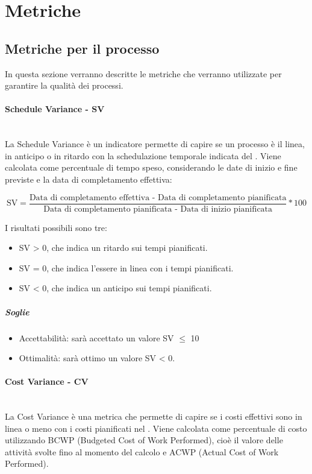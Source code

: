 \pagebreak
\section{Metriche}
\label{AppB:metric}
\subsection{Metriche per il processo}
\label{AppB:metricheProc}
In questa sezione verranno descritte le metriche che verranno utilizzate per garantire la qualità dei processi.

\paragraph{Schedule Variance - SV}
\label{AppB:SV}
	~\\La Schedule Variance è un indicatore permette di capire se un processo è il linea, in anticipo o in ritardo con la schedulazione temporale indicata del \PdP{}. Viene calcolata come percentuale di tempo speso, considerando le date di inizio e fine previste e la data di completamento effettiva:
	
	\begin{displaymath}
\mbox{SV}= \frac{\mbox{Data di completamento effettiva - Data di completamento pianificata}} {\mbox{Data di completamento pianificata - Data di inizio pianificata}} * 100
\end{displaymath}

I risultati possibili sono tre:

\begin{itemize}
\item SV > 0, che indica un ritardo sui tempi pianificati.
\item SV = 0, che indica l'essere in linea con i tempi pianificati.
\item SV < 0, che indica un anticipo sui tempi pianificati.
\end{itemize}

\subparagraph{Soglie}
\begin{itemize}
\item Accettabilità: sarà accettato un valore SV $\le$ 10%
\item Ottimalità: sarà ottimo un valore SV < 0.
\end{itemize}
	
\paragraph{Cost Variance - CV}
\label{AppB:CV}
	~\\La Cost Variance è una metrica che permette di capire se i costi effettivi sono in linea o meno con i costi pianificati nel \PdP{}. Viene calcolata come percentuale di costo utilizzando BCWP (Budgeted Cost of Work Performed), cioè il valore delle attività svolte fino al momento del calcolo e ACWP (Actual Cost of Work Performed).
	
